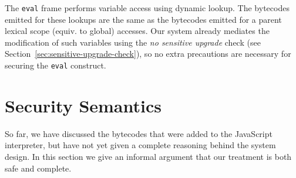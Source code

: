 \documentclass{llncs}
\begin{document}
The \texttt{eval} frame performs variable access using dynamic lookup.
The bytecodes emitted for these lookups are the same as the bytecodes emitted for a parent lexical scope (equiv. to global) accesses.
Our system already mediates the modification of such variables using the \textit{no sensitive upgrade} check (see Section~\ref{sec:sensitive-upgrade-check}), so no extra precautions are necessary for securing the \texttt{eval} construct.

\section{Security Semantics}
\label{sec:security-semantics}

So far, we have discussed the bytecodes that were added to the JavaScript interpreter, but have not yet given a complete reasoning behind the system design.
In this section we give an informal argument that our treatment is both safe and complete.
\end{document}
